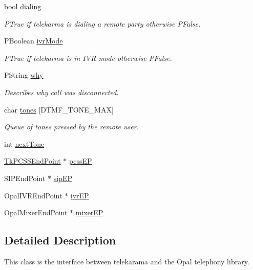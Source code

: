 \begin{CompactItemize}
bool \hyperlink{classTelephonyIfc_0ffb35f802c55694b5729e5bde971483}{dialing}
\begin{CompactList}\small\item\em PTrue if telekarma is dialing a remote party otherwise PFalse. \item\end{CompactList}\item 
PBoolean \hyperlink{classTelephonyIfc_377903745950f7376b919c2a4456debd}{ivrMode}
\begin{CompactList}\small\item\em PTrue if telekarma is in IVR mode otherwise PFalse. \item\end{CompactList}\item 
PString \hyperlink{classTelephonyIfc_f41ebe765b20a522ebd9c493c3bf77eb}{why}
\begin{CompactList}\small\item\em Describes why call was disconnected. \item\end{CompactList}\item 
char \hyperlink{classTelephonyIfc_8c18969f7ee88659b8b118c530f79bcd}{tones} \mbox{[}DTMF\_\-TONE\_\-MAX\mbox{]}
\begin{CompactList}\small\item\em Queue of tones pressed by the remote user. \item\end{CompactList}\item 
int \hyperlink{classTelephonyIfc_b857d1530a322453a8788c9bffbcc833}{nextTone}
\item 
\hyperlink{classTkPCSSEndPoint}{TkPCSSEndPoint} $\ast$ \hyperlink{classTelephonyIfc_692107ad53586332c50b34ea3b51f76d}{pcssEP}
\item 
SIPEndPoint $\ast$ \hyperlink{classTelephonyIfc_67fb79d2bcec4cc072421a5b4c2f4e16}{sipEP}
\item 
OpalIVREndPoint $\ast$ \hyperlink{classTelephonyIfc_022bae204ef5d791f5ea8184a1928fb9}{ivrEP}
\item 
OpalMixerEndPoint $\ast$ \hyperlink{classTelephonyIfc_f15ba6ddee44e5a1908044ba8a83eaa3}{mixerEP}
\end{CompactItemize}


\subsection{Detailed Description}
This class is the interface between telekarama and the Opal telephony library. 

